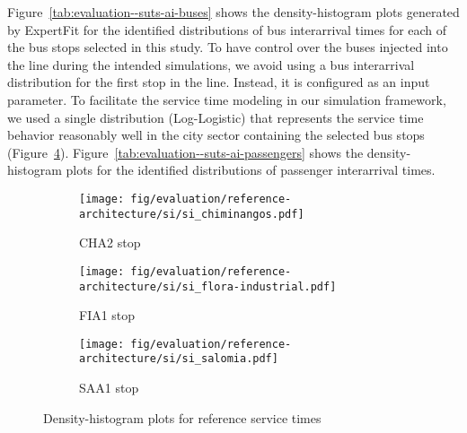 Figure~\ref{tab:evaluation--suts-ai-buses} shows the density-histogram plots generated by ExpertFit for the identified distributions of bus interarrival times for each of the bus stops selected in this study. To have control over the buses injected into the line during the intended simulations, we avoid using a bus interarrival distribution for the first stop in the line. Instead, it is configured as an input parameter. To facilitate the service time modeling in our simulation framework, we used a single distribution (Log-Logistic) that represents the service time behavior  reasonably well in the city sector containing the selected bus stops (\cf Figure~\ref{tab:evaluation--suts-si-buses}). Figure~\ref{tab:evaluation--suts-ai-passengers} shows the density-histogram plots for the identified distributions of passenger interarrival times.

\begin{figure}[b]
	\centering
	\begin{subfigure}[b]{0.3\textwidth}
		\centering
		\texttt{[image: fig/evaluation/reference-architecture/si/si\_chiminangos.pdf]}
		\caption{CHA2 stop}
		\label{tab:evaluation--suts-si-buses_CHA2}
	\end{subfigure}
	\begin{subfigure}[b]{0.3\textwidth}
		\centering
		\texttt{[image: fig/evaluation/reference-architecture/si/si\_flora-industrial.pdf]}
		\caption{FIA1 stop}
		\label{tab:evaluation--suts-si-buses_FIA1}
	\end{subfigure}
	\begin{subfigure}[b]{0.3\textwidth}
		\centering
		\texttt{[image: fig/evaluation/reference-architecture/si/si\_salomia.pdf]}
		\caption{SAA1 stop}
		\label{tab:evaluation--suts-si-buses_SAA1}
	\end{subfigure}
	\caption{Density-histogram plots for reference service times}
	\label{tab:evaluation--suts-si-buses}
\end{figure}

